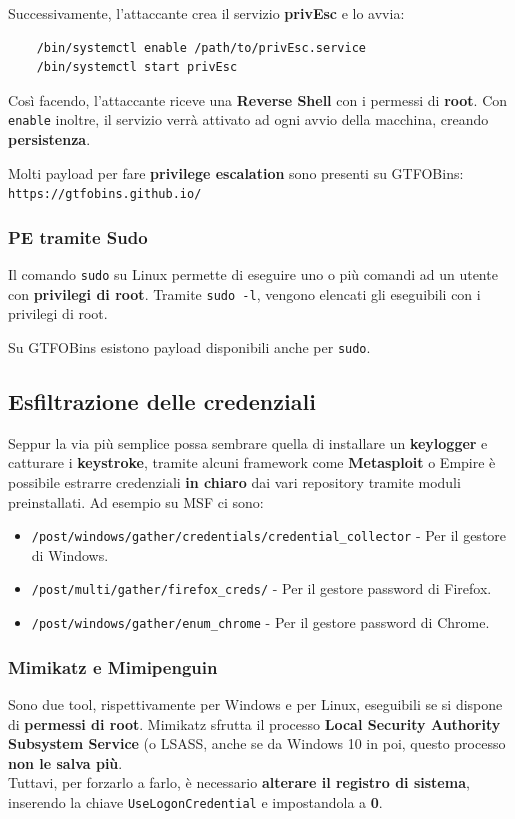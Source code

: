\documentclass{article}
\begin{document}
Successivamente, l'attaccante crea il servizio \textbf{privEsc} e lo avvia:
\begin{verbatim}
	/bin/systemctl enable /path/to/privEsc.service
	/bin/systemctl start privEsc
\end{verbatim}

Così facendo, l'attaccante riceve una \textbf{Reverse Shell} con i permessi di \textbf{root}. Con \verb|enable| inoltre, il servizio verrà attivato ad ogni avvio della macchina, creando \textbf{persistenza}.

Molti payload per fare \textbf{privilege escalation} sono presenti su GTFOBins: \verb|https://gtfobins.github.io/|

\subsubsection{PE tramite Sudo}
Il comando \verb|sudo| su Linux permette di eseguire uno o più comandi ad un utente con \textbf{privilegi di root}. Tramite \verb|sudo -l|, vengono elencati gli eseguibili con i privilegi di root.

Su GTFOBins esistono payload disponibili anche per \verb|sudo|.
\newpage
\subsection{Esfiltrazione delle credenziali}
Seppur la via più semplice possa sembrare quella di installare un \textbf{keylogger} e catturare i \textbf{keystroke}, tramite alcuni framework come \textbf{Metasploit} o Empire è possibile estrarre
credenziali \textbf{in chiaro} dai vari repository tramite moduli preinstallati. Ad esempio su MSF ci sono:
\begin{itemize}
	\item \verb|/post/windows/gather/credentials/credential_collector| - Per il gestore di Windows.
	\item \verb|/post/multi/gather/firefox_creds/| - Per il gestore password di Firefox.
	\item \verb|/post/windows/gather/enum_chrome| - Per il gestore password di Chrome.
\end{itemize}

\subsubsection{Mimikatz e Mimipenguin}

Sono due tool, rispettivamente per Windows e per Linux, eseguibili se si dispone di \textbf{permessi di root}. Mimikatz sfrutta il processo \textbf{Local Security Authority Subsystem Service} (o LSASS, anche se da Windows 10 in poi, questo processo \textbf{non le salva più}.\\
Tuttavi, per forzarlo a farlo, è necessario \textbf{alterare il registro di sistema}, inserendo la chiave \verb|UseLogonCredential| e impostandola a \textbf{0}.
\end{document}
